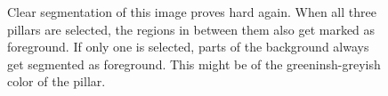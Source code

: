 \documentclass[11pt,a4paper]{article}
\begin{document}
\begin{figure}
\centering
{}
\quad
{}

\caption{Clear segmentation of this image proves hard again. When all three pillars are selected, the regions in between them also get marked as foreground. If only one is selected, parts of the background always get segmented as foreground. This might be of the greeninsh-greyish color of the pillar.}%

\end{figure}
\end{document}
